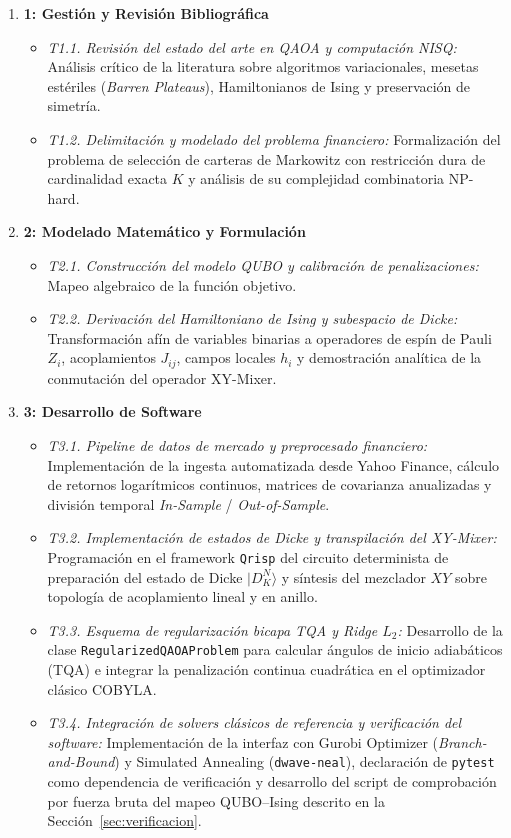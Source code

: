 \begin{enumerate}
    \item \textbf{1: Gestión y Revisión Bibliográfica}
    \begin{itemize}
        \item \textit{T1.1. Revisión del estado del arte en QAOA y computación NISQ:} Análisis crítico de la literatura sobre algoritmos variacionales, mesetas estériles (\textit{Barren Plateaus}), Hamiltonianos de Ising y preservación de simetría.
        \item \textit{T1.2. Delimitación y modelado del problema financiero:} Formalización del problema de selección de carteras de Markowitz con restricción dura de cardinalidad exacta $K$ y análisis de su complejidad combinatoria NP-hard.
    \end{itemize}

    \item \textbf{2: Modelado Matemático y Formulación}
    \begin{itemize}
        \item \textit{T2.1. Construcción del modelo QUBO y calibración de penalizaciones:} Mapeo algebraico de la función objetivo.
        \item \textit{T2.2. Derivación del Hamiltoniano de Ising y subespacio de Dicke:} Transformación afín de variables binarias a operadores de espín de Pauli $Z_i$, acoplamientos $J_{ij}$, campos locales $h_i$ y demostración analítica de la conmutación del operador XY-Mixer.
    \end{itemize}

    \item \textbf{3: Desarrollo de Software}
    \begin{itemize}
        \item \textit{T3.1. Pipeline de datos de mercado y preprocesado financiero:} Implementación de la ingesta automatizada desde Yahoo Finance, cálculo de retornos logarítmicos continuos, matrices de covarianza anualizadas y división temporal \textit{In-Sample} / \textit{Out-of-Sample}.
        \item \textit{T3.2. Implementación de estados de Dicke y transpilación del XY-Mixer:} Programación en el framework \texttt{Qrisp} del circuito determinista de preparación del estado de Dicke $|D_K^N\rangle$ y síntesis del mezclador $XY$ sobre topología de acoplamiento lineal y en anillo.
        \item \textit{T3.3. Esquema de regularización bicapa TQA y Ridge $L_2$:} Desarrollo de la clase \texttt{RegularizedQAOAProblem} para calcular ángulos de inicio adiabáticos (TQA) e integrar la penalización continua cuadrática en el optimizador clásico COBYLA.
        \item \textit{T3.4. Integración de solvers clásicos de referencia y verificación del software:} Implementación de la interfaz con Gurobi Optimizer (\textit{Branch-and-Bound}) y Simulated Annealing (\texttt{dwave-neal}), declaración de \texttt{pytest} como dependencia de verificación y desarrollo del script de comprobación por fuerza bruta del mapeo QUBO--Ising descrito en la Sección~\ref{sec:verificacion}.
    \end{itemize}


\end{enumerate}
